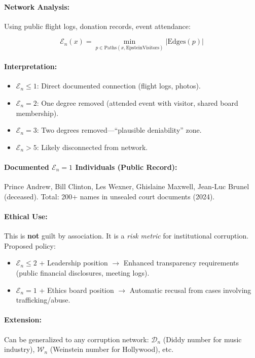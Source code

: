 \documentclass[11pt,a4paper]{article}
\theoremstyle{definition}
\theoremstyle{remark}
\begin{document}
\paragraph{Network Analysis:}
Using public flight logs, donation records, event attendance:

\[
\mathcal{E}_n(x) = \min_{p \in \text{Paths}(x, \text{EpsteinVisitors})} |\text{Edges}(p)|
\]

\paragraph{Interpretation:}
\begin{itemize}
\item $\mathcal{E}_n \leq 1$: Direct documented connection (flight logs, photos).
\item $\mathcal{E}_n = 2$: One degree removed (attended event with visitor, shared board membership).
\item $\mathcal{E}_n = 3$: Two degrees removed—``plausible deniability'' zone.
\item $\mathcal{E}_n > 5$: Likely disconnected from network.
\end{itemize}

\paragraph{Documented $\mathcal{E}_n = 1$ Individuals (Public Record):}
Prince Andrew, Bill Clinton, Les Wexner, Ghislaine Maxwell, Jean-Luc Brunel (deceased). Total: 200+ names in unsealed court documents (2024).

\paragraph{Ethical Use:}
This is \textbf{not} guilt by association. It is a \textit{risk metric} for institutional corruption. Proposed policy:
\begin{itemize}
\item $\mathcal{E}_n \leq 2$ + Leadership position $\rightarrow$ Enhanced transparency requirements (public financial disclosures, meeting logs).
\item $\mathcal{E}_n = 1$ + Ethics board position $\rightarrow$ Automatic recusal from cases involving trafficking/abuse.
\end{itemize}

\paragraph{Extension:}
Can be generalized to any corruption network: $\mathcal{D}_n$ (Diddy number for music industry), $\mathcal{W}_n$ (Weinstein number for Hollywood), etc.
\end{document}
